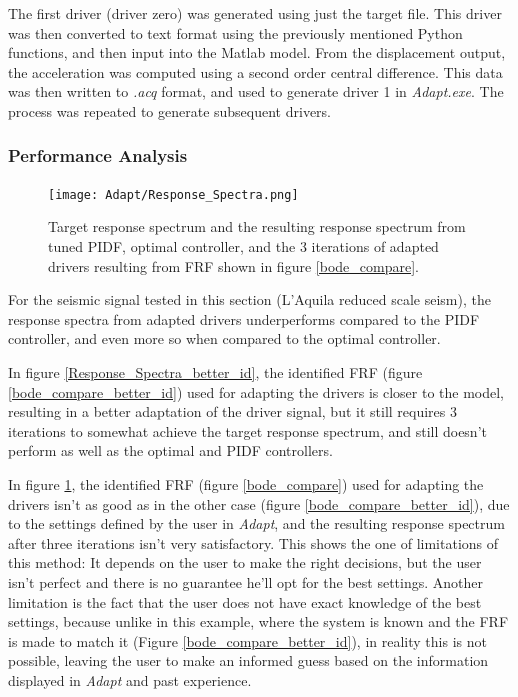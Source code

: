 \documentclass[9pt]{extarticle}
\begin{document}
The first driver (driver zero) was generated using just the target file. This driver was then converted to text format using the previously mentioned Python functions, and then input into the Matlab model. From the displacement output, the acceleration was computed using a second order central difference. This data was then written to \emph{.acq} format, and used to generate driver 1  in \emph{Adapt.exe}. The process was repeated to generate subsequent drivers.

\subsubsection{Performance Analysis}

\begin{figure}[H]
    \centering
    \texttt{[image: Adapt/Response\_Spectra.png]}
    \caption{Target response spectrum and the resulting response spectrum from tuned PIDF, optimal controller, and the 3 iterations of adapted drivers resulting from FRF shown in figure \ref{bode_compare}.}
    \label{Response_Spectra_2drivers}
\end{figure}

For the seismic signal tested in this section (L'Aquila reduced scale seism), the response spectra from adapted drivers underperforms compared to the PIDF controller, and even more so when compared to the optimal controller. 

In figure \ref{Response_Spectra_better_id}, the identified FRF (figure \ref{bode_compare_better_id}) used for adapting the drivers  is closer to the model, resulting in a better adaptation of the driver signal, but it still requires 3 iterations to somewhat achieve the target response spectrum, and still doesn't perform as well as the optimal and PIDF controllers.

In figure \ref{Response_Spectra_2drivers}, the identified FRF (figure \ref{bode_compare}) used for adapting the drivers isn't as good as in the other case (figure \ref{bode_compare_better_id}), due to the settings defined by the user in \emph{Adapt}, and the resulting response spectrum after three iterations isn't very satisfactory. This shows the one of limitations of this method: It depends on the user to make the right decisions, but the user isn't perfect and there is no guarantee he'll opt for the best settings. Another limitation is the fact that the user does not have exact knowledge of the best settings, because unlike in this example, where the system is known and the FRF is made to match it (Figure \ref{bode_compare_better_id}), in reality this is not possible, leaving the user to make an informed guess based on the information displayed in \emph{Adapt} and past experience.
\end{document}
